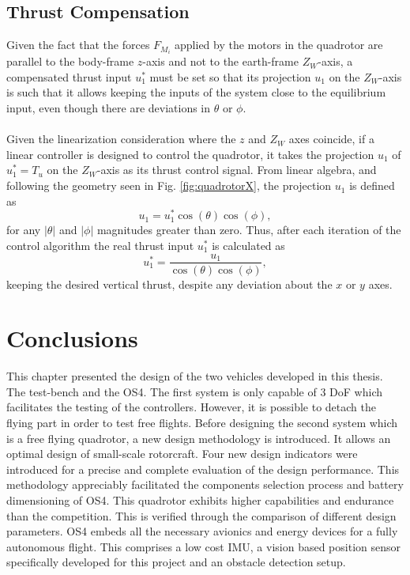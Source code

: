 \subsection{Thrust Compensation}
Given the fact that the forces $F_{M_i}$ applied by the motors in the quadrotor are parallel to the body-frame $z$-axis and not to the earth-frame $Z_W$-axis, a compensated thrust input $u_{1}^{*}$ must be set so that its projection $u_1$ on the $Z_W$-axis is such that it allows keeping the inputs of the system close to the equilibrium input, even though there are deviations in $\theta$ or $\phi$.
\\\\
Given the linearization consideration where the $z$ and $Z_W$ axes coincide, if a linear controller is designed to control the quadrotor, it takes the projection $u_{1}$ of $u_{1}^{*} = T_{u}$ on the $Z_W$-axis as its thrust control signal. From linear algebra, and following the geometry seen in Fig. \ref{fig:quadrotorX}, the projection $u_{1}$ is defined as
\begin{equation}
u_{1} = u_{1}^{*}\cos(\theta)\cos(\phi),
\end{equation}
for any $|\theta|$ and $|\phi|$ magnitudes greater than zero. Thus, after each iteration of the control algorithm the real thrust input $u_{1}^{*}$ is calculated as
\begin{equation}
u_{1}^{*} = \dfrac{u_{1}}{\cos(\theta)\cos(\phi)},
\end{equation}
keeping the desired vertical thrust, despite any deviation about the $x$ or $y$ axes.
\section{Conclusions}
This chapter presented the design of the two vehicles developed in this thesis.
The test-bench and the OS4. The first system is only capable of 3 DoF which
facilitates the testing of the controllers. However, it is possible to detach the
flying part in order to test free flights. Before designing the second system
which is a free flying quadrotor, a new design methodology is introduced. It
allows an optimal design of small-scale rotorcraft. Four new design indicators
were introduced for a precise and complete evaluation of the design performance.
This methodology appreciably facilitated the components selection
process and battery dimensioning of OS4. This quadrotor exhibits higher
capabilities and endurance than the competition. This is verified through
the comparison of different design parameters. OS4 embeds all the necessary
avionics and energy devices for a fully autonomous flight. This comprises a
low cost IMU, a vision based position sensor specifically developed for this
project and an obstacle detection setup.

